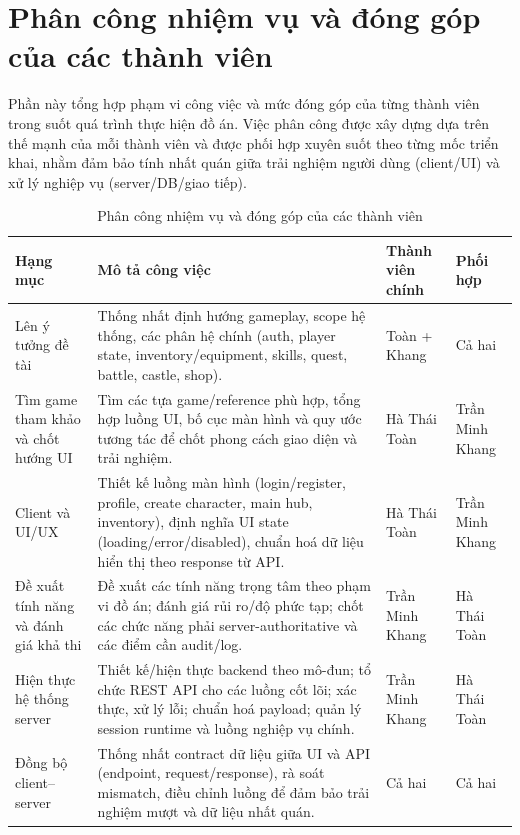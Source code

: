 ﻿%
\clearpage
\section*{Phân công nhiệm vụ và đóng góp của các thành viên}

Phần này tổng hợp phạm vi công việc và mức đóng góp của từng thành viên trong suốt quá trình thực hiện đồ án. Việc phân công được xây dựng dựa trên thế mạnh của mỗi thành viên và được phối hợp xuyên suốt theo từng mốc triển khai, nhằm đảm bảo tính nhất quán giữa trải nghiệm người dùng (client/UI) và xử lý nghiệp vụ (server/DB/giao tiếp).

\renewcommand{\arraystretch}{1.25}
\setlength{\tabcolsep}{6pt}

\begin{table}[H]
\centering
\begin{tabularx}{\textwidth}{|p{3.2cm}|X|p{3.2cm}|p{3.0cm}|}
\hline
\textbf{Hạng mục} & \textbf{Mô tả công việc} & \textbf{Thành viên chính} & \textbf{Phối hợp} \\
\hline
Lên ý tưởng đề tài & Thống nhất định hướng gameplay, scope hệ thống, các phân hệ chính (auth, player state, inventory/equipment, skills, quest, battle, castle, shop). & Toàn + Khang & Cả hai \\
\hline
Tìm game tham khảo và chốt hướng UI & Tìm các tựa game/reference phù hợp, tổng hợp luồng UI, bố cục màn hình và quy ước tương tác để chốt phong cách giao diện và trải nghiệm. & Hà Thái Toàn & Trần Minh Khang \\
\hline
Client và UI/UX & Thiết kế luồng màn hình (login/register, profile, create character, main hub, inventory), định nghĩa UI state (loading/error/disabled), chuẩn hoá dữ liệu hiển thị theo response từ API. & Hà Thái Toàn & Trần Minh Khang \\
\hline
Đề xuất tính năng và đánh giá khả thi & Đề xuất các tính năng trọng tâm theo phạm vi đồ án; đánh giá rủi ro/độ phức tạp; chốt các chức năng phải server-authoritative và các điểm cần audit/log. & Trần Minh Khang & Hà Thái Toàn \\
\hline
Hiện thực hệ thống server & Thiết kế/hiện thực backend theo mô-đun; tổ chức REST API cho các luồng cốt lõi; xác thực, xử lý lỗi; chuẩn hoá payload; quản lý session runtime và luồng nghiệp vụ chính. & Trần Minh Khang & Hà Thái Toàn \\
\hline
Đồng bộ client--server & Thống nhất contract dữ liệu giữa UI và API (endpoint, request/response), rà soát mismatch, điều chỉnh luồng để đảm bảo trải nghiệm mượt và dữ liệu nhất quán. & Cả hai & Cả hai \\
\hline
\end{tabularx}
\caption{Phân công nhiệm vụ và đóng góp của các thành viên}
\label{tab:team-contributions}
\end{table}

\clearpage
